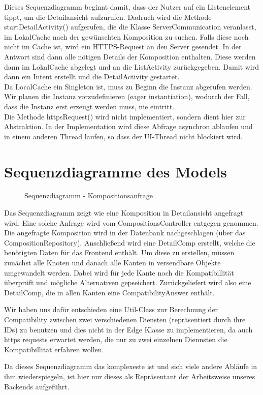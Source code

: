 Dieses Sequenzdiagramm beginnt damit, dass der Nutzer auf ein Listenelement tippt, um die Detailansicht aufzurufen. 
Dadruch wird die Methode startDetailActivity() aufgerufen, die die Klasse ServerCommunication veranlasst, im LokalCache nach der gewünschten Komposition zu suchen.
Falls diese noch nicht im Cache ist, wird ein HTTPS-Request an den Server gesendet.
In der Antwort sind dann alle nötigen Details der Komposition enthalten.
Diese werden dann im LokalCache abgelegt und an die ListActivity zurückgegeben.
Damit wird dann ein Intent erstellt und die DetailActivity gestartet.
\\
Da LocalCache ein Singleton ist, muss zu Beginn die Instanz abgerufen werden. Wir planen die Instanz vorzudefinieren (eager instantiation), wodurch der Fall, dass die Instanz erst erzeugt werden muss, nie eintritt.
\\
Die Methode httpsRequest() wird nicht implementiert, sondern dient hier zur Abstraktion. In der Implementation wird diese Abfrage asynchron ablaufen und in einem anderen Thread laufen, so dass der UI-Thread nicht blockiert wird. 

\section*{Sequenzdiagramme des Models}

\begin{figure}[h]
	\centering
	\caption{Sequenzdiagramm - Kompositionsanfrage}
	\label{fig:sequenz-a}
\end{figure}

Das Sequenzdiagramm zeigt wie eine Komposition in Detailansicht angefragt wird. Eine solche Anfrage wird vom CompositionsController entgegen genommen. Die angefragte Komposition wird in der Datenbank nachgeschlagen (über das CompositionRepository). Anschließend wird eine DetailComp erstellt, welche die benötigten Daten für das Frontend enthält. Um diese zu erstellen, müssen zunächst alle Knoten und danach alle Kanten in versendbare Objekte umgewandelt werden. Dabei wird für jede Kante noch die Kompatibillität überprüft und mögliche Alternativen gepseichert. Zurückgeliefert wird also eine DetailComp, die in allen Kanten eine CompatibilityAnswer enthält.\newline

Wir haben uns dafür entschieden eine Util-Class zur Berechnung der Compatibility zwischen zwei verschiedenen Diensten (repräsentiert durch ihre IDs) zu benutzen und dies nicht in der Edge Klasse zu implementieren, da auch https requests erwartet werden, die nur zu zwei einzelnen Diennsten die Kompatibillität erfahren wollen.\newline

Da dieses Sequenzdiagramm das komplexeste ist und sich viele andere Abläufe in ihm wiederspiegeln, ist hier nur dieses als Repräsentant der Arbeitsweise unseres Backends aufgeführt.

